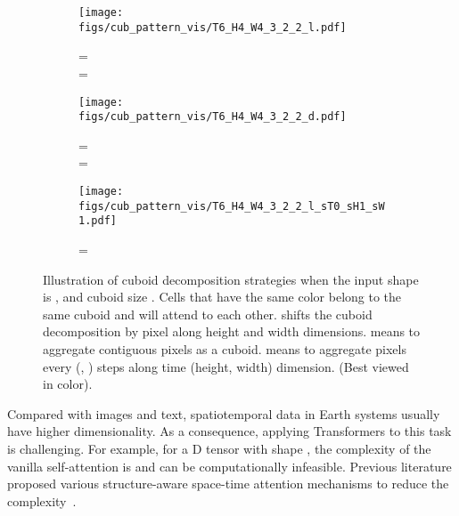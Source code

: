 \documentclass{article}
\begin{document}
\begin{figure}
     \centering
     \captionsetup[subfigure]{
        format=hang,
        singlelinecheck=false,
justification=centering
     }  \hspace*{-1.0cm}
     \begin{subfigure}[b]{0.20\textwidth}
         \centering
\texttt{[image: figs/cub\_pattern\_vis/T6\_H4\_W4\_3\_2\_2\_l.pdf]}
         \vspace{-0.8cm}
         \caption{=\protect\\ =}
     \end{subfigure}
     \qquad
     \begin{subfigure}[b]{0.20\textwidth}
         \centering
\texttt{[image: figs/cub\_pattern\_vis/T6\_H4\_W4\_3\_2\_2\_d.pdf]}
         \vspace{-0.8cm}
         \caption{=\protect\\ =}
     \end{subfigure}
     \qquad
     \begin{subfigure}[b]{0.20\textwidth}
         \centering
\texttt{[image: figs/cub\_pattern\_vis/T6\_H4\_W4\_3\_2\_2\_l\_sT0\_sH1\_sW1.pdf]}
         \vspace{-0.8cm}
         \caption{=\protect\\ }
     \end{subfigure}
     \caption{Illustration of cuboid decomposition strategies when the input shape is , and cuboid size . Cells that have the same color belong to the same cuboid and will attend to each other.  shifts the cuboid decomposition by  pixel along height and width dimensions.  means to aggregate contiguous  pixels as a cuboid.  means to aggregate pixels every  (, ) steps along time (height, width) dimension. (Best viewed in color).}
     \vspace{-1em}
     \label{fig:cuboid_pattern_illustration}
\end{figure}




Compared with images and text, spatiotemporal data in Earth systems usually have higher dimensionality. As a consequence, applying Transformers to this task is challenging.
For example, for a D tensor with shape , the complexity of the vanilla self-attention is  and can be computationally infeasible. Previous literature 
proposed various structure-aware space-time attention mechanisms to reduce the complexity~\cite{ho2019axial,liu2021video,bertasius2021space}.
\end{document}
